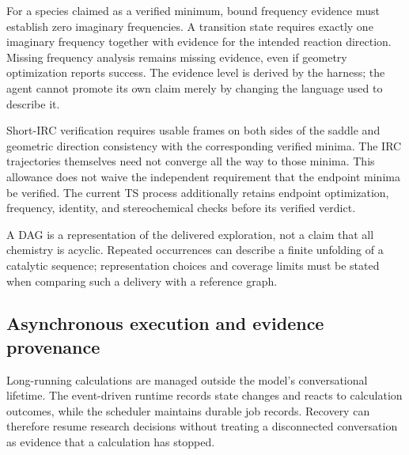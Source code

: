 \documentclass[11pt,a4paper]{article}
\begin{document}
For a species claimed as a verified minimum, bound frequency evidence must establish zero imaginary frequencies. A transition state requires exactly one imaginary frequency together with evidence for the intended reaction direction. Missing frequency analysis remains missing evidence, even if geometry optimization reports success. The evidence level is derived by the harness; the agent cannot promote its own claim merely by changing the language used to describe it.

Short-IRC verification requires usable frames on both sides of the saddle and geometric direction consistency with the corresponding verified minima. The IRC trajectories themselves need not converge all the way to those minima. This allowance does not waive the independent requirement that the endpoint minima be verified. The current TS process additionally retains endpoint optimization, frequency, identity, and stereochemical checks before its verified verdict.

A DAG is a representation of the delivered exploration, not a claim that all chemistry is acyclic. Repeated occurrences can describe a finite unfolding of a catalytic sequence; representation choices and coverage limits must be stated when comparing such a delivery with a reference graph.

\begin{center}
\end{center}

\subsection{Asynchronous execution and evidence provenance}
Long-running calculations are managed outside the model's conversational lifetime. The event-driven runtime records state changes and reacts to calculation outcomes, while the scheduler maintains durable job records. Recovery can therefore resume research decisions without treating a disconnected conversation as evidence that a calculation has stopped.
\end{document}
